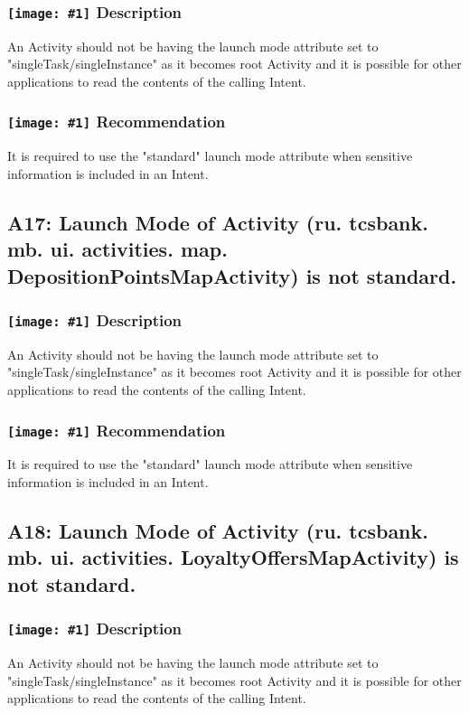 \documentclass[12p]{article}
\newcommand{\icon}[1]{\texttt{[image: \#1]}}
\begin{document}
\subsubsection*{\protect\icon{/home/miki/Documents/GITHUB/AndroidPermissions/python/vulns/report_icons/basic_sheet.png} Description}
An Activity should not be having the launch mode attribute set to "singleTask/singleInstance" as it becomes root Activity and it is possible for other applications to read the contents of the calling Intent.
\subsubsection*{\protect\icon{/home/miki/Documents/GITHUB/AndroidPermissions/python/vulns/report_icons/basic_todo.png} Recommendation}
It is required to use the "standard" launch mode attribute when sensitive information is included in an Intent.
\subsection{A17: Launch Mode of Activity (ru. tcsbank. mb. ui. activities. map. DepositionPointsMapActivity) is not standard.}
\subsubsection*{\protect\icon{/home/miki/Documents/GITHUB/AndroidPermissions/python/vulns/report_icons/basic_sheet.png} Description}
An Activity should not be having the launch mode attribute set to "singleTask/singleInstance" as it becomes root Activity and it is possible for other applications to read the contents of the calling Intent.
\subsubsection*{\protect\icon{/home/miki/Documents/GITHUB/AndroidPermissions/python/vulns/report_icons/basic_todo.png} Recommendation}
It is required to use the "standard" launch mode attribute when sensitive information is included in an Intent.
\subsection{A18: Launch Mode of Activity (ru. tcsbank. mb. ui. activities. LoyaltyOffersMapActivity) is not standard.}
\subsubsection*{\protect\icon{/home/miki/Documents/GITHUB/AndroidPermissions/python/vulns/report_icons/basic_sheet.png} Description}
An Activity should not be having the launch mode attribute set to "singleTask/singleInstance" as it becomes root Activity and it is possible for other applications to read the contents of the calling Intent.
\end{document}
